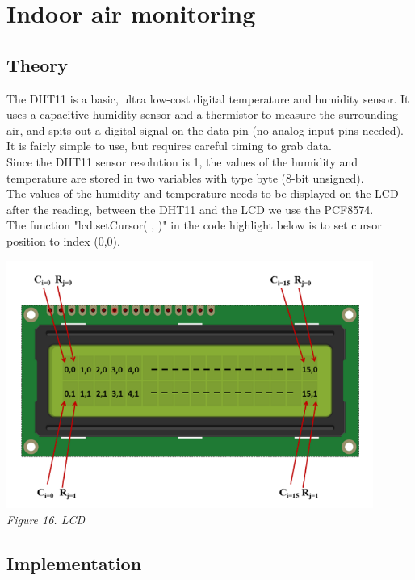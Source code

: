 \documentclass[a4paper]{article}
\begin{document}
\newpage
\section{Indoor air monitoring}
\subsection{Theory}
The DHT11 is a basic, ultra low-cost digital temperature and humidity sensor. It uses a capacitive humidity sensor and a thermistor to measure the surrounding air, and spits out a digital signal on the data pin (no analog input pins needed). It is fairly simple to use, but requires careful timing to grab data.\bigskip\\
Since the DHT11 sensor resolution is 1, the values of the humidity and temperature are stored in two variables with type byte (8-bit unsigned).\bigskip\\
The values of the humidity and temperature needs to be displayed on the LCD after the reading, between the DHT11 and the LCD we use the PCF8574.\bigskip\\
The function "lcd.setCursor( , )" in the code highlight below is to set cursor position to index (0,0).
\medskip
\begin{center}
    \includegraphics[width=12cm]{pictures/LCD.png}\\
    \textit{Figure 16. LCD}\\
\end{center}
\medskip
\subsection{Implementation}
\end{document}
